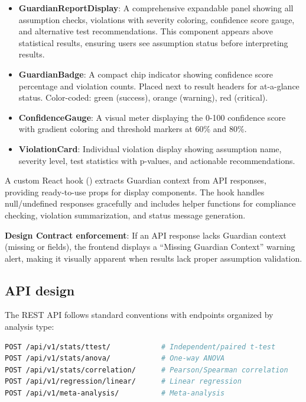 \documentclass[article]{jss}
\begin{document}
\begin{itemize}
\item \textbf{GuardianReportDisplay}: A comprehensive expandable panel showing all assumption checks, violations with severity coloring, confidence score gauge, and alternative test recommendations. This component appears above statistical results, ensuring users see assumption status before interpreting results.

\item \textbf{GuardianBadge}: A compact chip indicator showing confidence score percentage and violation counts. Placed next to result headers for at-a-glance status. Color-coded: green (success), orange (warning), red (critical).

\item \textbf{ConfidenceGauge}: A visual meter displaying the 0-100 confidence score with gradient coloring and threshold markers at 60\% and 80\%.

\item \textbf{ViolationCard}: Individual violation display showing assumption name, severity level, test statistics with p-values, and actionable recommendations.
\end{itemize}

A custom React hook () extracts Guardian context from API responses, providing ready-to-use props for display components. The hook handles null/undefined responses gracefully and includes helper functions for compliance checking, violation summarization, and status message generation.

\textbf{Design Contract enforcement}: If an API response lacks Guardian context (missing  or  fields), the frontend displays a ``Missing Guardian Context'' warning alert, making it visually apparent when results lack proper assumption validation.

\subsection{API design}

The REST API follows standard conventions with endpoints organized by analysis type:

\begin{lstlisting}[language=bash,caption={API endpoint structure}]
POST /api/v1/stats/ttest/            # Independent/paired t-test
POST /api/v1/stats/anova/            # One-way ANOVA
POST /api/v1/stats/correlation/      # Pearson/Spearman correlation
POST /api/v1/regression/linear/      # Linear regression
POST /api/v1/meta-analysis/          # Meta-analysis
\end{lstlisting}
\end{document}
